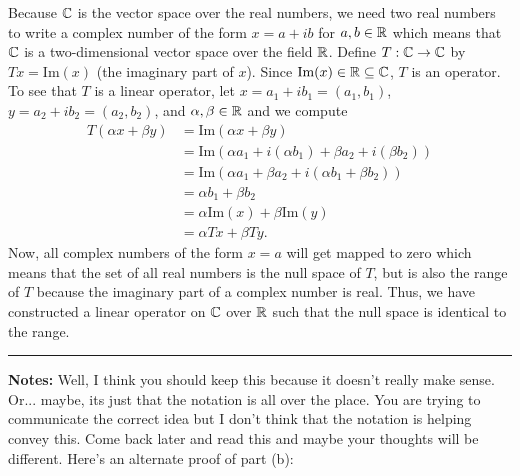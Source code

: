 \documentclass{article}
\begin{document}
	Because $\mathbb C$ is the vector space over the real numbers, we need two real numbers to write a complex number of the form $x = a+ib$ for $a,b\in\mathbb R$ which
	means that $\mathbb C$ is a two-dimensional vector space over the field $\mathbb R$. Define $T: \mathbb C \to \mathbb C$ by $Tx = \text{Im}(x)$ (the imaginary part of $x$). Since
	 $\text{Im}(x)\in\mathbb R\subseteq \mathbb C$, $T$ is an operator. To see that $T$ is a linear operator, let $x = a_1 + ib_1 = (a_1, b_1)$, $y = a_2 + ib_2 = (a_2, b_2)$, and
	  $\alpha, \beta\in\mathbb R$ and we compute 
	  	\begin{align*}
			T(\alpha x+ \beta y) & = \text{Im}(\alpha x+ \beta y)\\
						       & = \text{Im}(\alpha a_1 + i(\alpha b_1) + \beta a_2 + i (\beta b_2))\\
						       & = \text{Im}(\alpha a_1 + \beta a_2 + i(\alpha b_1 + \beta b_2))\\
						       & = \alpha b_1 + \beta b_2\\
						       & = \alpha \text{Im}(x) + \beta  \text{Im}(y)\\
						       & = \alpha Tx + \beta Ty.
		\end{align*}
	Now, all complex numbers of the form $x = a$ will get mapped to zero which means that the set of all real numbers is the null space of $T$, but is also the
	range of $T$ because the imaginary part of a complex number is real. Thus, we have constructed a linear operator on $\mathbb C$ over $\mathbb R$ such that the null space
	is identical to the range.\\
	
\hrule

\textbf{Notes:} Well, I think you should keep this because it doesn't really make sense. Or... maybe, its just that the notation is all over the place. You are trying to communicate the correct idea but I don't think that the notation is helping convey this. Come back later and read this and maybe your thoughts will be different. Here's an alternate proof of part (b):\\
\end{document}
